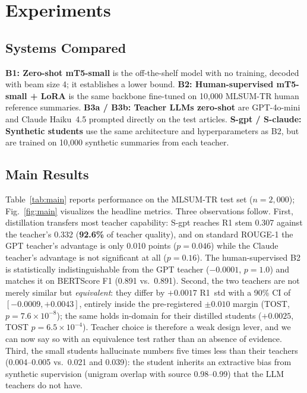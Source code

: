 \documentclass[conference]{IEEEtran}
\begin{document}
\section{Experiments}
\subsection{Systems Compared}
\textbf{B1: Zero-shot mT5-small} is the off-the-shelf model with no training, decoded with beam size 4; it establishes a lower bound. \textbf{B2: Human-supervised mT5-small + LoRA} is the same backbone fine-tuned on 10{,}000 MLSUM-TR human reference summaries. \textbf{B3a / B3b: Teacher LLMs zero-shot} are GPT-4o-mini and Claude Haiku~4.5 prompted directly on the test articles. \textbf{S-gpt / S-claude: Synthetic students} use the same architecture and hyperparameters as B2, but are trained on 10{,}000 synthetic summaries from each teacher.

\subsection{Main Results}
Table~\ref{tab:main} reports performance on the MLSUM-TR test set ($n{=}2{,}000$); Fig.~\ref{fig:main} visualizes the headline metrics. Three observations follow. First, distillation transfers most teacher capability: S-gpt reaches R1 stem 0.307 against the teacher's 0.332 (\textbf{92.6\%} of teacher quality), and on standard ROUGE-1 the GPT teacher's advantage is only 0.010 points ($p{=}0.046$) while the Claude teacher's advantage is not significant at all ($p{=}0.16$). The human-supervised B2 is statistically indistinguishable from the GPT teacher ($-0.0001$, $p{=}1.0$) and matches it on BERTScore F1 (0.891 vs.\ 0.891). Second, the two teachers are not merely similar but \emph{equivalent}: they differ by $+0.0017$ R1~std with a 90\% CI of $[-0.0009,+0.0043]$, entirely inside the pre-registered $\pm0.010$ margin (TOST, $p{=}7.6\times10^{-8}$); the same holds in-domain for their distilled students ($+0.0025$, TOST $p{=}6.5\times10^{-4}$). Teacher choice is therefore a weak design lever, and we can now say so with an equivalence test rather than an absence of evidence. Third, the small students hallucinate numbers five times less than their teachers (0.004--0.005 vs.\ 0.021 and 0.039): the student inherits an extractive bias from synthetic supervision (unigram overlap with source 0.98--0.99) that the LLM teachers do not have.
\end{document}
